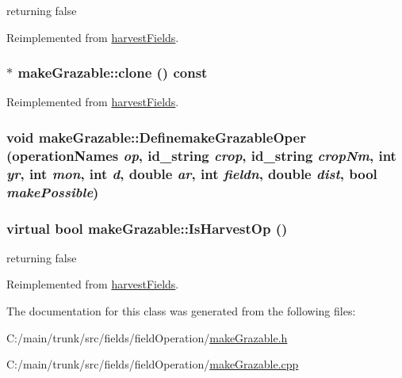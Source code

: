 returning false 

Reimplemented from \hyperlink{classharvest_fields_a9fcfd4121d8290708c8db3da63a56d78}{harvestFields}.\hypertarget{classmake_grazable_a52ff627730636a7a71b975a203edbf5f}{
\subsubsection[{clone}]{ $\ast$ makeGrazable::clone () const}}
\label{classmake_grazable_a52ff627730636a7a71b975a203edbf5f}


Reimplemented from \hyperlink{classharvest_fields_aa252f8782663a14d3ccefff889279b36}{harvestFields}.\hypertarget{classmake_grazable_a0f9a354af4fef5ecc865d5bdbf76ec31}{
\subsubsection[{DefinemakeGrazableOper}]{\setlength{\rightskip}{0pt plus 5cm}void makeGrazable::DefinemakeGrazableOper ({\bf operationNames} {\em op}, \/  {\bf id\_\-string} {\em crop}, \/  {\bf id\_\-string} {\em cropNm}, \/  int {\em yr}, \/  int {\em mon}, \/  int {\em d}, \/  double {\em ar}, \/  int {\em fieldn}, \/  double {\em dist}, \/  bool {\em makePossible})}}
\label{classmake_grazable_a0f9a354af4fef5ecc865d5bdbf76ec31}
\hypertarget{classmake_grazable_a0c637b243ff0bc8232d121553f417573}{
\subsubsection[{IsHarvestOp}]{\setlength{\rightskip}{0pt plus 5cm}virtual bool makeGrazable::IsHarvestOp ()}}
\label{classmake_grazable_a0c637b243ff0bc8232d121553f417573}


returning false 

Reimplemented from \hyperlink{classharvest_fields_ab50f128112be82518c06028ecb470cb7}{harvestFields}.

The documentation for this class was generated from the following files:\begin{DoxyCompactItemize}
\item 
C:/main/trunk/src/fields/fieldOperation/\hyperlink{make_grazable_8h}{makeGrazable.h}\item 
C:/main/trunk/src/fields/fieldOperation/\hyperlink{make_grazable_8cpp}{makeGrazable.cpp}\end{DoxyCompactItemize}
